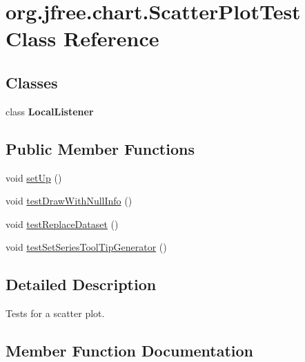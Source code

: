 \hypertarget{classorg_1_1jfree_1_1chart_1_1_scatter_plot_test}{}\section{org.\+jfree.\+chart.\+Scatter\+Plot\+Test Class Reference}
\label{classorg_1_1jfree_1_1chart_1_1_scatter_plot_test}
\subsection*{Classes}
\begin{DoxyCompactItemize}
\item 
class {\bfseries Local\+Listener}
\end{DoxyCompactItemize}
\subsection*{Public Member Functions}
\begin{DoxyCompactItemize}
\item 
void \mbox{\hyperlink{classorg_1_1jfree_1_1chart_1_1_scatter_plot_test_a3aca14760607fd95f53fdcb31ff97e1d}{set\+Up}} ()
\item 
void \mbox{\hyperlink{classorg_1_1jfree_1_1chart_1_1_scatter_plot_test_a223f95caee1296b21e6bcfa859c9de06}{test\+Draw\+With\+Null\+Info}} ()
\item 
void \mbox{\hyperlink{classorg_1_1jfree_1_1chart_1_1_scatter_plot_test_a598a1211c5a7bba9a864d1cee02ef037}{test\+Replace\+Dataset}} ()
\item 
void \mbox{\hyperlink{classorg_1_1jfree_1_1chart_1_1_scatter_plot_test_a42e9fe842b5d6f0d756680fe685e7a1b}{test\+Set\+Series\+Tool\+Tip\+Generator}} ()
\end{DoxyCompactItemize}


\subsection{Detailed Description}
Tests for a scatter plot. 

\subsection{Member Function Documentation}
\mbox{\label{classorg_1_1jfree_1_1chart_1_1_scatter_plot_test_a3aca14760607fd95f53fdcb31ff97e1d}} 
